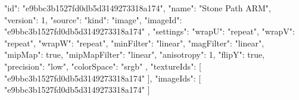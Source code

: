 {
  "id": "e9bbc3b1527fd0db5d3149273318a174",
  "name": "Stone Path ARM",
  "version": 1,
  "source": {
    "kind": "image",
    "imageId": "e9bbc3b1527fd0db5d3149273318a174"
  },
  "settings": {
    "wrapU": "repeat",
    "wrapV": "repeat",
    "wrapW": "repeat",
    "minFilter": "linear",
    "magFilter": "linear",
    "mipMap": true,
    "mipMapFilter": "linear",
    "anisotropy": 1,
    "flipY": true,
    "precision": "low",
    "colorSpace": "srgb"
  },
  "textureIds": [
    "e9bbc3b1527fd0db5d3149273318a174"
  ],
  "imageIds": [
    "e9bbc3b1527fd0db5d3149273318a174"
  ]
}

